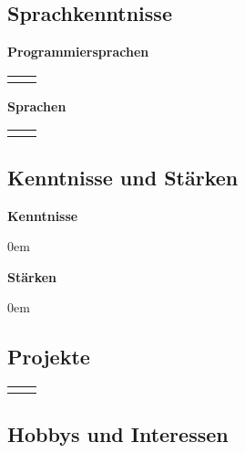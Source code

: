 ﻿\documentclass[
	a4paper,
	fontsize=12
]{scrartcl}
\begin{document}
\subsection{Sprachkenntnisse}
\begin{minipage}[t]{0.5\textwidth}
	\textbf{Programmiersprachen\medskip}\\
	\begin{tabularx}{\textwidth}{l!{\color{RoyalBlue}\vrule}X}
		\CVProgLangs
	\end{tabularx}
\end{minipage}
\begin{minipage}[t]{0.5\textwidth}
	\textbf{Sprachen\medskip}\\
	\begin{tabularx}{\textwidth}{l!{\color{RoyalBlue}\vrule}X}
		\CVNatLangs
	\end{tabularx}
\end{minipage}

\subsection{Kenntnisse und Stärken}
\begin{minipage}[t]{0.5\textwidth}
	\textbf{Kenntnisse}
	\begin{flushleft}
	\begin{itemize}\itemsep0em
		\CVKnowledge
	\end{itemize}
	\end{flushleft}
\end{minipage}
\BlueVLine{ }
\begin{minipage}[t]{0.5\textwidth}
	\textbf{Stärken}
	\begin{flushleft}
	\begin{itemize}\itemsep0em
		\CVStrength
	\end{itemize}
	\end{flushleft}
\end{minipage}

\filbreak
\subsection{Projekte}
\begin{flushleft}
	\setlength{\extrarowheight}{.5em}
	\begin{tabularx}{\textwidth}{l!{\color{RoyalBlue}\vrule}X}
		\CVProjects
	\end{tabularx}
\end{flushleft}

\subsection{Hobbys und Interessen}
	\CVHobbiesInterests
\newpage
\end{document}
